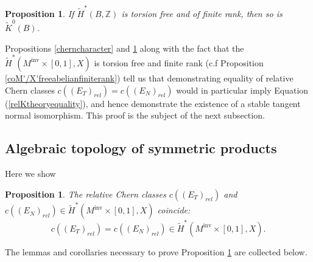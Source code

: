 \documentclass[11pt]{amsart}
\newtheorem{proposition}[theorem]{Proposition}
\theoremstyle{definition}
\theoremstyle{remark}
\def\Z{\mathbb{Z}}
\newcommand{\M}{M^{\operatorname{inv}}}
\numberwithin{equation}{section}
\begin{document}
\begin{proposition}\cite[~Section 2.5]{MR139181}\label{HomKtorsionfree}
    If $\widetilde{H}^*(B,\Z)$ is torsion free and of finite rank, then so is $\widetilde{K}^0(B)$.
\end{proposition}
Propositions \ref{cherncharacter} and \ref{HomKtorsionfree} along with the fact that the $\widetilde{H}^*(\M\times[0,1],X)$ is torsion free and finite rank (c.f Proposition \ref{coM'/X'freeabelianfiniterank}) tell us that demonstrating equality of relative Chern classes $c((E_T)_{rel})=c((E_N)_{rel})$ would in particular imply Equation (\ref{relKtheoryequality}), and hence demonstrate the existence of a stable tangent normal isomorphism. This proof is the subject of the next subsection.
 
  \subsection{Algebraic topology of symmetric products}\label{chern}Here we show
\begin{proposition}  
\label{chernTNrel}
    The relative Chern classes $c((E_T)_{rel})$ and $c((E_N)_{rel})\in \widetilde{H}^{*}(\M\times [0,1],X)$ coincide:
    \begin{equation}\label{relequal}
c((E_T)_{rel})=c((E_N)_{rel})\in \widetilde{H}^{*}(\M\times[0,1],X).
\end{equation}
\end{proposition}
The lemmas and corollaries necessary to prove Proposition \ref{chernTNrel} are collected below.
\end{document}
